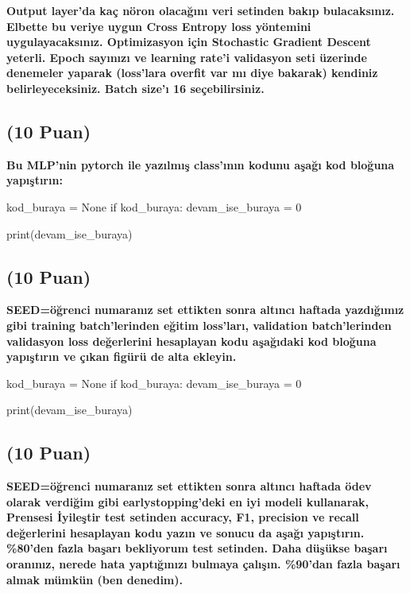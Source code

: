 \documentclass[11pt]{article}
\begin{document}
\textbf{Output layer'da kaç nöron olacağını veri setinden bakıp bulacaksınız. Elbette bu veriye uygun Cross Entropy loss yöntemini uygulayacaksınız. Optimizasyon için Stochastic Gradient Descent yeterli. Epoch sayınızı ve learning rate'i validasyon seti üzerinde denemeler yaparak (loss'lara overfit var mı diye bakarak) kendiniz belirleyeceksiniz. Batch size'ı 16 seçebilirsiniz.}

\subsection{(10 Puan)} \textbf{Bu MLP'nin pytorch ile yazılmış class'ının kodunu aşağı kod bloğuna yapıştırın:}

\begin{python}
kod_buraya = None
if kod_buraya:
    devam_ise_buraya = 0

print(devam_ise_buraya)
\end{python}

\subsection{(10 Puan)} \textbf{SEED=öğrenci numaranız set ettikten sonra altıncı haftada yazdığımız gibi training batch'lerinden eğitim loss'ları, validation batch'lerinden validasyon loss değerlerini hesaplayan kodu aşağıdaki kod bloğuna yapıştırın ve çıkan figürü de alta ekleyin.}

\begin{python}
kod_buraya = None
if kod_buraya:
    devam_ise_buraya = 0

print(devam_ise_buraya)
\end{python}

\begin{comment}
\begin{figure}[ht!]
    \centering
    \texttt{[image: mypicturehere.png]}
    \caption{Buraya açıklama yazın}
    \label{fig:my_pic}
\end{figure}
\end{comment}

\subsection{(10 Puan)} \textbf{SEED=öğrenci numaranız set ettikten sonra altıncı haftada ödev olarak verdiğim gibi earlystopping'deki en iyi modeli kullanarak, Prensesi İyileştir test setinden accuracy, F1, precision ve recall değerlerini hesaplayan kodu yazın ve sonucu da aşağı yapıştırın. \%80'den fazla başarı bekliyorum test setinden. Daha düşükse başarı oranınız, nerede hata yaptığınızı bulmaya çalışın. \%90'dan fazla başarı almak mümkün (ben denedim).}
\end{document}
